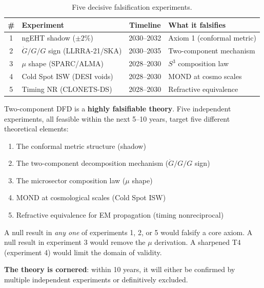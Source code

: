 \documentclass[11pt]{article}
\newcommand{\Gdot}{\dot{G}/G}
\newcommand{\mufd}{\mu}
\begin{document}
\begin{table}[H]
\centering
\caption{Five decisive falsification experiments.}
\label{tab:falsify}
\begin{tabular}{clcl}
\toprule
\textbf{\#} & \textbf{Experiment} & \textbf{Timeline} &
\textbf{What it falsifies} \\
\midrule
1 & ngEHT shadow ($\pm 2\%$) & 2030--2032 & Axiom 1 (conformal metric) \\
2 & $\Gdot/G$ sign (LLRRA-21/SKA) & 2030--2035 & Two-component mechanism \\
3 & $\mufd$ shape (SPARC/ALMA) & 2028--2030 & $S^3$ composition law \\
4 & Cold Spot ISW (DESI voids) & 2028--2030 & MOND at cosmo scales \\
5 & Timing NR (CLONETS-DS) & 2028--2030 & Refractive equivalence \\
\bottomrule
\end{tabular}
\end{table}

\begin{tcolorbox}[colback=blue!5!white, colframe=blue!60!black,
  title=\textbf{Falsifiability Assessment}]
Two-component DFD is a \textbf{highly falsifiable theory}. Five
independent experiments, all feasible within the next 5--10 years,
target five different theoretical elements:
\begin{enumerate}[nosep]
\item The conformal metric structure (shadow)
\item The two-component decomposition mechanism ($\Gdot/G$ sign)
\item The microsector composition law ($\mufd$ shape)
\item MOND at cosmological scales (Cold Spot ISW)
\item Refractive equivalence for EM propagation (timing nonreciprocal)
\end{enumerate}

A null result in \emph{any one} of experiments 1, 2, or 5 would
falsify a core axiom. A null result in experiment 3 would remove the
$\mufd$ derivation. A sharpened T4 (experiment 4) would limit the
domain of validity.

\textbf{The theory is cornered}: within 10 years, it will either be
confirmed by multiple independent experiments or definitively
excluded.
\end{tcolorbox}


\newpage
\end{document}
